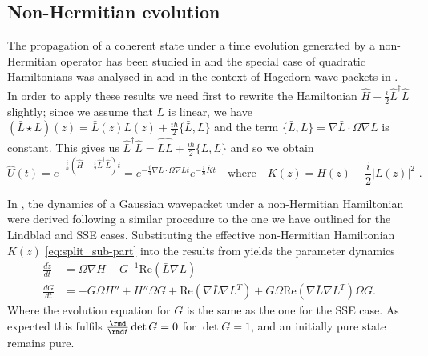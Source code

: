 \documentclass[12pt]{iopart} %
\begin{document}
\subsection{Non-Hermitian evolution}
 
 The propagation of a coherent state under a time evolution generated by a non-Hermitian operator has been studied in \cite{graefe2011wave} and the special case of quadratic Hamiltonians was analysed in \cite{graefe2012complexified} and in the context of Hagedorn wave-packets in \cite{lasser2018non}. In order to apply these results we need first to rewrite the Hamiltonian $\hat H -\frac{i}{2} \hat L^{\dagger}\hat L$ slightly; since we assume that $L$ is linear, we have $(\bar{L}\star L)(z)=\bar{L}(z)L(z)+\frac{i\hbar}{2} \{\bar{L},L\}$ and the term $\{\bar{L},L\}=\nabla \bar{L}\cdot \Omega\nabla L$ is constant. This gives us $\hat L^{\dagger}\hat L=\widehat {\bar{L}L}+\frac{i\hbar }{2} \{\bar{L},L\}$ and so we obtain
\begin{equation}\label{eq:split_sub-part}
\hat U(t)=e^{-\frac{i}{\hbar} ( \hat H -\frac{i}{2} \hat L^{\dagger}\hat L)t}=e^{-\frac{i}{4 }\nabla \bar{L}\cdot \Omega\nabla Lt}e^{-\frac{i}{\hbar} \hat K t} \quad \text{where}\quad K(z)=H(z)-\frac{i}{2}|L(z)|^2\,\, .
\end{equation}

In \cite{graefe2011wave}, the dynamics of a Gaussian wavepacket under a non-Hermitian Hamiltonian were derived following a similar procedure to the one we have outlined for the Lindblad and SSE cases. Substituting the effective non-Hermitian Hamiltonian $K(z)$ \eqref{eq:split_sub-part} into the results from \cite{graefe2011wave} yields the parameter dynamics 
\begin{eqnarray} 
\label{eq:NHVNsemiz}
    \frac{d \tilde z}{d t} &= \Omega \nabla H-G^{-1} \text{Re}(\bar L \nabla L) \\
\label{eq:NHVNsemiG}	\frac{d G}{dt} &=-G\Omega H''+ H'' \Omega G+\text{Re}(\nabla \bar L  \nabla L^T ) +G \Omega \text{Re}(\nabla \bar L  \nabla L^T ) \Omega G.
\end{eqnarray}
Where the evolution equation for $G$ is the same as the one for the SSE case. 
As expected this fulfils $\frac{\rmd}{\rmd t}\det G=0$ for $\det G=1$, and an initially pure state remains pure.
\end{document}
